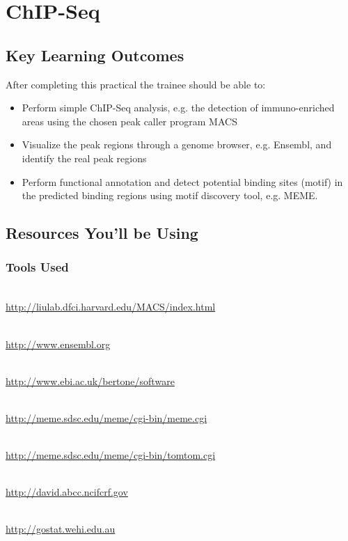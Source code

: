 \renewcommand{\moduleTitle}{ChIP-Seq}
\renewcommand{\moduleAuthors}{%
  Remco Loos, EMBL-EBI \mailto{remco@ebi.ac.uk} \\
  Myrto Kostadima \mailto{kostadim@ebi.ac.uk}
} \renewcommand{\moduleContributions}{%
  Xi Li \mailto{sean.li@csiro.au}%
}

\chapter{\moduleTitle}
\newpage

\section{Key Learning Outcomes}

After completing this practical the trainee should be able to:
\begin{itemize}
  \item Perform simple ChIP-Seq analysis, e.g. the detection of immuno-enriched areas using the chosen peak caller program MACS
  \item Visualize the peak regions through a genome browser, e.g. Ensembl, and identify the real peak regions
  \item Perform functional annotation and detect potential binding sites (motif) in the predicted binding regions using motif discovery tool, e.g. MEME.
\end{itemize}

\section{Resources You'll be Using}
 
\subsection{Tools Used}
\begin{description}[style=multiline,labelindent=0cm,align=left,leftmargin=0.5cm]
  \item[MACS]\hfill\\
  	\url{http://liulab.dfci.harvard.edu/MACS/index.html}
  \item[Ensembl]\hfill\\
  	\url{http://www.ensembl.org}
  \item[PeakAnalyzer]\hfill\\
  	\url{http://www.ebi.ac.uk/bertone/software}
  \item[MEME]\hfill\\
  	\url{http://meme.sdsc.edu/meme/cgi-bin/meme.cgi}
  \item[TOMTOM]\hfill\\
  	\url{http://meme.sdsc.edu/meme/cgi-bin/tomtom.cgi}  
  \item[DAVID]\hfill\\
  	\url{http://david.abcc.ncifcrf.gov}
  \item[GOstat]\hfill\\
    \url{http://gostat.wehi.edu.au}
\end{description}

